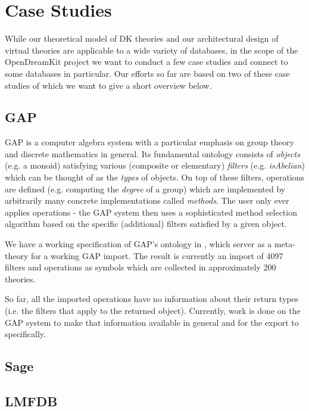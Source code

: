 \section{Case Studies}\label{sec:cases}

While our theoretical model of DK theories and our architectural design of virtual
theories are applicable to a wide variety of databases, in the scope of the OpenDreamKit
project we want to conduct a few case studies and connect to some databases in
particular. Our efforts so far are based on two of these case studies of which we want to
give a short overview below.

\subsection{GAP}\label{sec:gap}
GAP \cite{gap} is a computer algebra system with a particular emphasis on group theory and discrete mathematics in general. Its fundamental
ontology consists of \emph{objects} (e.g. a monoid) satisfying various (composite or elementary) \emph{filters} (e.g. \emph{isAbelian}) which
can be thought of as the \emph{types} of objects.
On top of these filters, operations are defined (e.g. computing the \emph{degree} of a group) which are implemented by arbitrarily many concrete implementations
called \emph{methods}. The user only ever applies operations - the GAP system then uses a sophisticated method selection algorithm based on
the specific (additional) filters satisfied by a given object.

We have a working specification of GAP's ontology in \MMT, which server as a meta-theory for a working GAP import. The result is currently an import
of 4097 filters and operations as \MMT symbols which are collected in approximately 200 theories.

So far, all the imported operations have no information about their return types (i.e. the filters that apply to the returned object). Currently, work is done on the GAP system
to make that information available in general and for the export to \MMT specifically.

\subsection{Sage}\label{sec:sage}

\subsection{LMFDB}\label{sec:lmfdb}

